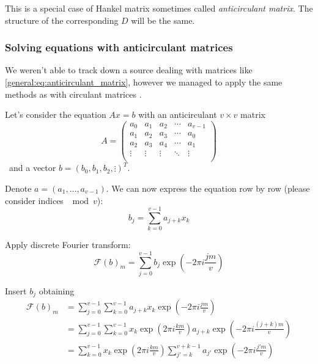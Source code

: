     This is a special case of Hankel matrix sometimes called \emph{anticirculant matrix}. The structure of the corresponding $D$ will be the same.
    
    \subsubsection{Solving equations with anticirculant matrices}
    \label{general:sec:anticirculant}
        We weren't able to track down a source dealing with matrices like \eqref{general:eq:anticirculant_matrix}, however we managed to apply the same methods as with circulant matrices \cite{wiki:circulant_matrix}.
        
        Let's consider the equation $Ax=b$ with an anticirculant $v \times v$ matrix
        \begin{equation}
            A =
            \begin{pmatrix}
                a_0 & a_1 & a_2 & \cdots & a_{v-1} \\ 
                a_1 & a_2 & a_3 & \cdots & a_0 \\
                a_2 & a_3 & a_4 & \cdots & a_1 \\
                \vdots & \vdots & \vdots & \ddots & \vdots \\
            \end{pmatrix}
        \end{equation}\
        and a vector $b=(b_0, b_1, b_2, \vdots)^T$. 
        
        Denote $a=(a_1,\ldots,a_{v-1})$. We can now express the equation row by row (please consider indices $\mod v$):
        \begin{equation}
            b_j = \sum_{k=0}^{v-1} a_{j+k} x_k
        \end{equation}
        
        Apply discrete Fourier transform:
        \begin{equation}
            \mathcal{F} (b)_m = \sum_{j=0}^{v-1} b_j \exp(-2\pi i \frac{jm}v )
        \end{equation}
        
        Insert $b_j$ obtaining
        \begin{equation}
        \begin{split}
            \mathcal{F} (b)_m
            &= \sum_{j=0}^{v-1} \sum_{k=0}^{v-1} a_{j+k} x_k \exp(-2\pi i \frac{jm}v) \\
            &= \sum_{j=0}^{v-1} \sum_{k=0}^{v-1} x_k \exp(2\pi i \frac{km}v) a_{j+k} \exp(-2\pi i \frac{(j+k)m}v)  \\
            &= \sum_{k=0}^{v-1} x_k \exp(2\pi i \frac{km}v) \sum_{j'=k}^{v+k-1} a_{j'} \exp(-2\pi i \frac{j'm}v)
        \end{split}
        \end{equation}
        
